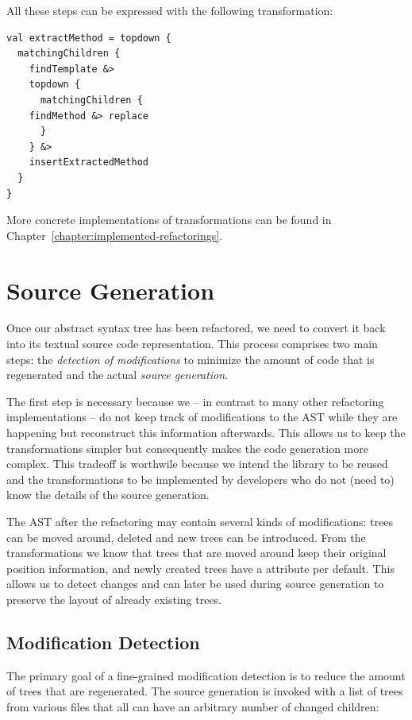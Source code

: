 
All these steps can be expressed with the following transformation:

\begin{lstlisting}
val extractMethod = topdown {
  matchingChildren {
    findTemplate &> 
    topdown {
      matchingChildren {
	findMethod &> replace
      }
    } &> 
    insertExtractedMethod
  }
}
\end{lstlisting}

More concrete implementations of transformations can be found in Chapter~\vref{chapter:implemented-refactorings}.
\newpage
\section{Source Generation}\label{section:source-generation}

Once our abstract syntax tree has been refactored, we need to convert it back into its textual source code representation. This process comprises two main steps: the \textit{detection of modifications} to minimize the amount of code that is regenerated and the actual \textit{source generation}.

The first step is necessary because we -- in contrast to many other refactoring implementations -- do not keep track of modifications to the AST while they are happening but reconstruct this information afterwards. This allows us to keep the transformations simpler but consequently makes the code generation more complex. This tradeoff is worthwile because we intend the library to be reused and the transformations to be implemented by developers who do not (need to) know the details of the source generation.

The AST after the refactoring may contain several kinds of modifications: trees can be moved around, deleted and new trees can be introduced. From the transformations we know that trees that are moved around keep their original position information, and newly created trees have a  attribute per default. This allows us to detect changes and can later be used during source generation to preserve the layout of already existing trees. 

\subsection{Modification Detection}

The primary goal of a fine-grained modification detection is to reduce the amount of trees that are regenerated. The source generation is invoked with a list of trees from various files that all can have an arbitrary number of changed children:

